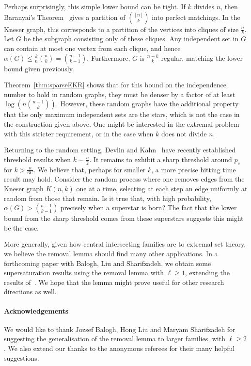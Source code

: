 \documentclass[11pt]{article}
\theoremstyle{definition}
\newcommand{\3}{\bf{3}}
\renewcommand{\l}{\ensuremath{\ell}}
\begin{document}
Perhaps surprisingly, this simple lower bound can be tight.  If $k$ divides $n$, then Baranyai's Theorem~\cite{bar75} gives a partition of $\binom{[n]}{k}$ into perfect matchings.  In the Kneser graph, this corresponds to a partition of the vertices into cliques of size $\frac{n}{k}$.  Let $G$ be the subgraph consisting only of these cliques.  Any independent set in $G$ can contain at most one vertex from each clique, and hence $\alpha(G) \le \frac{k}{n} \binom{n}{k} = \binom{n-1}{k-1}$.  Furthermore, $G$ is $\frac{n-k}{k}$-regular, matching the lower bound given previously.

Theorem~\ref{thm:sparseEKR} shows that for this bound on the independence number to hold in random graphs, they must be denser by a factor of at least $\log \left( n \binom{n-1}{k} \right)$.  However, these random graphs have the additional property that the only maximum independent sets are the stars, which is not the case in the construction given above.  One might be interested in the extremal problem with this stricter requirement, or in the case when $k$ does not divide $n$.

Returning to the random setting, Devlin and Kahn~\cite{dk15} have recently established threshold results when $k \sim \frac{n}{2}$.  It remains to exhibit a sharp threshold around $p_c$ for $k > \frac{n}{6C}$.  We believe that, perhaps for smaller $k$, a more precise hitting time result may hold.  Consider the random process where one removes edges from the Kneser graph $K(n,k)$ one at a time, selecting at each step an edge uniformly at random from those that remain.  Is it true that, with high probability, $\alpha(G) > \binom{n-1}{k-1}$ precisely when a superstar is born?  The fact that the lower bound from the sharp threshold comes from these superstars suggests this might be the case.

More generally, given how central intersecting families are to extremal set theory, we believe the removal lemma should find many other applications.  In a forthcoming paper with Balogh, Liu and Sharifzadeh, we obtain some supersaturation results using the removal lemma with $\l \ge 1$, extending the results of~\cite{dgs14}.  We hope that the lemma might prove useful for other research directions as well.

\paragraph{Acknowledgements} We would like to thank Jozsef Balogh, Hong Liu and Maryam Sharifzadeh for suggesting the generalisation of the removal lemma to larger families, with $\l \ge 2$.  We also extend our thanks to the anonymous referees for their many helpful suggestions.
\end{document}
